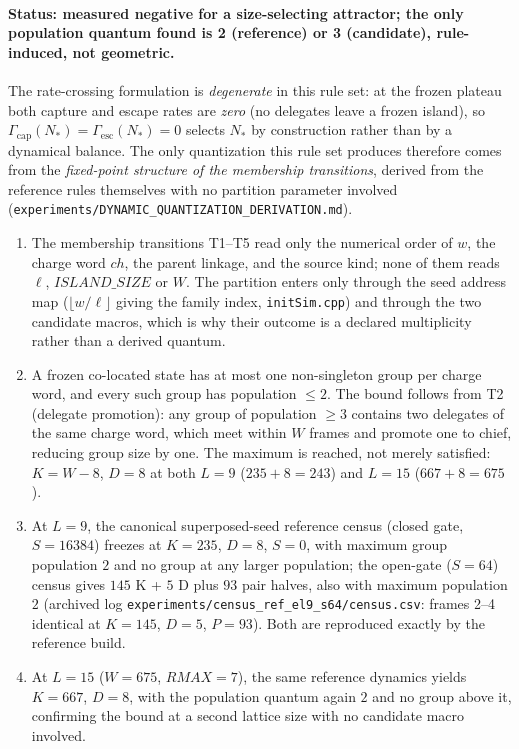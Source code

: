 \documentclass{ijuc}
\begin{document}
\paragraph{Status: measured negative for a size-selecting attractor; the only population quantum found is 2 (reference) or 3 (candidate), rule-induced, not geometric.}
The rate-crossing formulation is \emph{degenerate} in this rule set: at the frozen plateau both capture and escape rates are \emph{zero} (no delegates leave a frozen island), so $\Gamma_{\mathrm{cap}}(N_*) = \Gamma_{\mathrm{esc}}(N_*) = 0$ selects $N_*$ by construction rather than by a dynamical balance. The only quantization this rule set produces therefore comes from the \emph{fixed-point structure of the membership transitions}, derived from the reference rules themselves with no partition parameter involved (\texttt{experiments/DYNAMIC\_QUANTIZATION\_DERIVATION.md}).
\begin{enumerate}
\item The membership transitions T1--T5 read only the numerical order of $w$, the charge word $ch$, the parent linkage, and the source kind; none of them reads $\ell$, $ISLAND\_SIZE$ or $W$. The partition enters only through the seed address map ($\lfloor w/\ell\rfloor$ giving the family index, \texttt{initSim.cpp}) and through the two candidate macros, which is why their outcome is a declared multiplicity rather than a derived quantum.
\item A frozen co-located state has at most one non-singleton group per charge word, and every such group has population $\le 2$. The bound follows from T2 (delegate promotion): any group of population $\ge 3$ contains two delegates of the same charge word, which meet within $W$ frames and promote one to chief, reducing group size by one. The maximum is reached, not merely satisfied: $K = W - 8$, $D = 8$ at both $L = 9$ ($235 + 8 = 243$) and $L = 15$ ($667 + 8 = 675$).
\item At $L = 9$, the canonical superposed-seed reference census (closed gate, $S = 16384$) freezes at $K = 235$, $D = 8$, $S = 0$, with maximum group population $2$ and no group at any larger population; the open-gate ($S = 64$) census gives $145$ K + $5$ D plus $93$ pair halves, also with maximum population $2$ (archived log \texttt{experiments/census\_ref\_el9\_s64/census.csv}: frames 2--4 identical at $K=145$, $D=5$, $P=93$). Both are reproduced exactly by the reference build.
\item At $L = 15$ ($W = 675$, $RMAX = 7$), the same reference dynamics yields $K = 667$, $D = 8$, with the population quantum again $2$ and no group above it, confirming the bound at a second lattice size with no candidate macro involved.
\end{enumerate}
\end{document}
